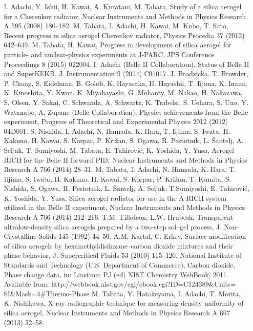 \documentclass[5p,twocolumn]{elsarticle}
\begin{document}
\begin{thebibliography}{00}
I. Adachi, Y. Ishii, H. Kawai, A. Kuratani, M. Tabata, Study of a silica aerogel for a Cherenkov radiator, Nuclear Instruments and Methods in Physics Research A 595 (2008) 180--182.
M. Tabata, I. Adachi, H. Kawai, M. Kubo, T. Sato, Recent progress in silica aerogel Cherenkov radiator, Physics Procedia 37 (2012) 642--649.
M. Tabata, H. Kawai, Progress in development of silica aerogel for particle- and nuclear-physics experiments at J-PARC, JPS Conference Proceedings 8 (2015) 022004.
I. Adachi (Belle II Collaboration), Status of Belle II and SuperKEKB, J. Instrumentation 9 (2014) C07017.
J. Brodzicka, T. Browder, P. Chang, S. Eidelman, B. Golob, K. Hayasaka, H. Hayashii, T. Iijima, K. Inami, K. Kinoshita, Y. Kwon, K. Miyabayashi, G. Mohanty, M. Nakao, H. Nakazawa, S. Olsen, Y. Sakai, C. Schwanda, A. Schwartz, K. Trabelsi, S. Uehara, S. Uno, Y. Watanabe, A. Zupanc (Belle Collaboration), Physics achievements from the Belle experiment, Progress of Theoretical and Experimental Physics 2012 (2012) 04D001.
S. Nishida, I. Adachi, N. Hamada, K. Hara, T. Iijima, S. Iwata, H. Kakuno, H. Kawai, S. Korpar, P. Kri\v{z}an, S. Ogawa, R. Pestotnik, L. \v{S}antelj, A. Seljak, T. Sumiyoshi, M. Tabata, E. Tahirovi\'{c}, K. Yoshida, Y. Yusa, Aerogel RICH for the Belle II forward PID, Nuclear Instruments and Methods in Physics Research A 766 (2014) 28--31.
M. Tabata, I. Adachi, N. Hamada, K. Hara, T. Iijima, S. Iwata, H. Kakuno, H. Kawai, S. Korpar, P. Kri\v{z}an, T. Kumita, S. Nishida, S. Ogawa, R. Pestotnik, L. \v{S}antelj, A. Seljak, T.Sumiyoshi, E. Tahirovi\'{c}, K. Yoshida, Y. Yusa, Silica aerogel radiator for use in the A-RICH system utilized in the Belle II experiment, Nuclear Instruments and Methods in Physics Research A 766 (2014) 212--216.
T.M. Tillotson, L.W. Hrubesh, Transparent ultralow-density silica aerogels prepared by a two-step sol--gel process, J. Non-Crystalline Solids 145 (1992) 44--50.
A.M. Kartal, C. Erkey, Surface modification of silica aerogels by hexamethyldisilazane--carbon dioxide mixtures and their phase behavior, J. Supercritical Fluids 53 (2010) 115--120.
National Institute of Standards and Technology (U.S. Department of Commerce), Carbon dioxide, Phase change data, in: Linstrom PJ (ed) NIST Chemistry WebBook, 2011. Available from: http://webbook.nist.gov/cgi/cbook.cgi?ID=C124389\&Units=\\SI\&Mask=4\#Thermo-Phase
M. Tabata, Y. Hatakeyama, I. Adachi, T. Morita, K. Nishikawa, X-ray radiographic technique for measuring density uniformity of silica aerogel, Nuclear Instruments and Methods in Physics Research A 697 (2013) 52--58.

\end{thebibliography}
\end{document}
